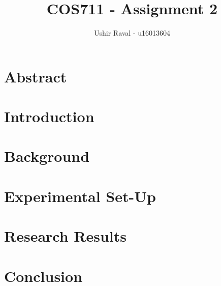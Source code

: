 \documentclass{report}
\title{COS711 - Assignment 2}
\author{Ushir Raval - u16013604}
\begin{document}
\maketitle

\section{Abstract}


\section{Introduction}


\section{Background}


\section{Experimental Set-Up}


\section{Research Results}


\section{Conclusion}

\end{document}

